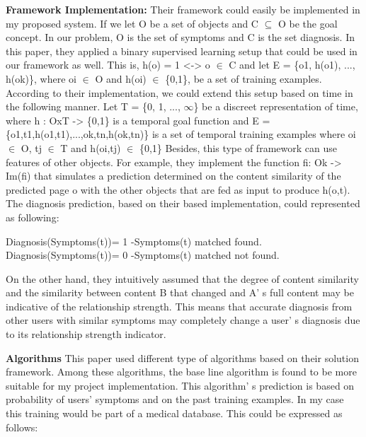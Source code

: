 \documentclass{sig-alternate}
\begin{document}
\textbf{Framework Implementation:}\newline
Their framework could easily be implemented in my proposed system. If we let O be a set of objects and C $\subseteq$ O be the goal concept. In our problem, O is the set of symptoms and C is the set diagnosis. In this paper, they applied a binary supervised learning setup that could be used in our framework as well. This is, h(o) = 1 <-> o $\in$ C and let E = \{o1, h(o1), ..., h(ok)\}, where oi $\in$ O and h(oi) $\in$ \{0,1\}, be a set of training examples. According to their implementation, we could extend this setup based on time in the following manner. Let T = \{0, 1, ..., $\infty$\} be a discreet representation of time, where h : OxT -> \{0,1\} is a temporal goal function and E = \{o1,t1,h(o1,t1),...,ok,tn,h(ok,tn)\} is a set of temporal training examples where oi $\in$ O, tj $\in$ T and h(oi,tj) $\in$ \{0,1\} Besides, this type of framework can use features of other objects. For example, they implement the function fi: Ok -> Im(fi) that simulates a prediction determined on the content similarity of the predicted page o with the other objects that are fed as input to produce h(o,t). The diagnosis prediction, based on their based implementation, could represented as following:\newline

Diagnosis(Symptoms(t))= 1 -Symptoms(t) matched found.\newline
Diagnosis(Symptoms(t))= 0 -Symptoms(t) matched not found.\newline

On the other hand, they intuitively assumed that the degree of content similarity and the similarity between content B that changed and A' s full content may be indicative of the relationship strength. This means that accurate diagnosis from other users with similar symptoms may completely change a user' s diagnosis due to its relationship strength indicator.\newline

\textbf{Algorithms}\newline
This paper used different type of algorithms based on their solution framework. Among these algorithms, the base line algorithm is found to be more suitable for my project implementation. This algorithm' s prediction is based on probability of users' symptoms and on the past training examples. In my case this training would be part of a medical database. This could be expressed as follows:\newline
\end{document}
